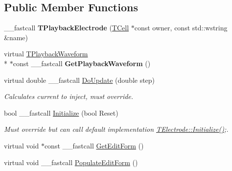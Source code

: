\subsection*{Public Member Functions}
\begin{DoxyCompactItemize}
\item 
\hypertarget{class_t_playback_electrode_a9a701d62d133f7328f80d5cda6f41704}{\+\_\+\+\_\+fastcall {\bfseries T\+Playback\+Electrode} (\hyperlink{class_t_cell}{T\+Cell} $\ast$const owner, const std\+::wstring \&name)}\label{class_t_playback_electrode_a9a701d62d133f7328f80d5cda6f41704}

\item 
\hypertarget{class_t_playback_electrode_aa6bc9934b13a28827b1e03ae92e9e3ff}{virtual \hyperlink{class_t_playback_waveform}{T\+Playback\+Waveform} \\*
$\ast$const \+\_\+\+\_\+fastcall {\bfseries Get\+Playback\+Waveform} ()}\label{class_t_playback_electrode_aa6bc9934b13a28827b1e03ae92e9e3ff}

\item 
\hypertarget{class_t_playback_electrode_a1d114194553aca06068cc828b8d791ee}{virtual double \+\_\+\+\_\+fastcall \hyperlink{class_t_playback_electrode_a1d114194553aca06068cc828b8d791ee}{Do\+Update} (double step)}\label{class_t_playback_electrode_a1d114194553aca06068cc828b8d791ee}

\begin{DoxyCompactList}\small\item\em Calculates current to inject, must override. \end{DoxyCompactList}\item 
\hypertarget{class_t_playback_electrode_a580e65eece4114789fe39f6d7a1cf689}{bool \+\_\+\+\_\+fastcall \hyperlink{class_t_playback_electrode_a580e65eece4114789fe39f6d7a1cf689}{Initialize} (bool Reset)}\label{class_t_playback_electrode_a580e65eece4114789fe39f6d7a1cf689}

\begin{DoxyCompactList}\small\item\em Must override but can call default implementation \hyperlink{class_t_electrode_a5f5711cfc03619d470acbe5669e59930}{T\+Electrode\+::\+Initialize()};. \end{DoxyCompactList}\item 
virtual void $\ast$const \+\_\+\+\_\+fastcall \hyperlink{class_t_playback_electrode_af870739aeec24862ed6333dc453951a1}{Get\+Edit\+Form} ()
\item 
\hypertarget{class_t_playback_electrode_af7362654435567684bc94fd02cebc5e1}{virtual void \+\_\+\+\_\+fastcall \hyperlink{class_t_playback_electrode_af7362654435567684bc94fd02cebc5e1}{Populate\+Edit\+Form} ()}\label{class_t_playback_electrode_af7362654435567684bc94fd02cebc5e1}


\end{DoxyCompactItemize}
